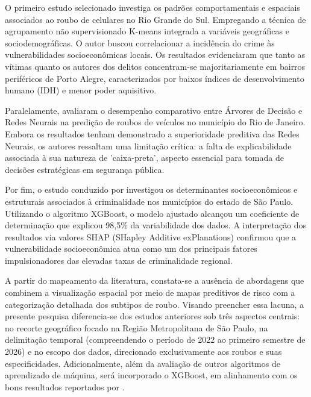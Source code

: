 \documentclass[12pt]{article}
\begin{document}
O primeiro estudo selecionado \cite{couto2024identificaccao} investiga os padrões comportamentais e espaciais associados ao roubo de celulares no Rio Grande do Sul. Empregando a técnica de agrupamento não supervisionado K-means integrada a variáveis geográficas e sociodemográficas. O autor buscou correlacionar a incidência do crime às vulnerabilidades socioeconômicas locais. Os resultados evidenciaram que tanto as vítimas quanto os autores dos delitos concentram-se majoritariamente em bairros periféricos de Porto Alegre, caracterizados por baixos índices de desenvolvimento humano (IDH) e menor poder aquisitivo.

Paralelamente, \cite{de2025previsao} avaliaram o desempenho comparativo entre Árvores de Decisão e Redes Neurais na predição de roubos de veículos no município do Rio de Janeiro. Embora os resultados tenham demonstrado a superioridade preditiva das Redes Neurais, os autores ressaltam uma limitação crítica: a falta de explicabilidade associada à sua natureza de 'caixa-preta', aspecto essencial para tomada de decisões estratégicas em segurança pública.

Por fim, o estudo conduzido por \cite{fernandes2025aplicaccao} investigou os determinantes socioeconômicos e estruturais associados à criminalidade nos municípios do estado de São Paulo. Utilizando o algoritmo XGBoost, o modelo ajustado alcançou um coeficiente de determinação que explicou 98,5\% da variabilidade dos dados. A interpretação dos resultados via valores SHAP (SHapley Additive exPlanations) confirmou que a vulnerabilidade socioeconômica atua como um dos principais fatores impulsionadores das elevadas taxas de criminalidade regional.

A partir do mapeamento da literatura, constata-se a ausência de abordagens que combinem a visualização espacial por meio de mapas preditivos de risco com a categorização detalhada dos subtipos de roubo. Visando preencher essa lacuna, a presente pesquisa diferencia-se dos estudos anteriores sob três aspectos centrais: no recorte geográfico focado na Região Metropolitana de São Paulo, na delimitação temporal (compreendendo o período de 2022 ao primeiro semestre de 2026) e no escopo dos dados, direcionado exclusivamente aos roubos e suas especificidades. Adicionalmente, além da avaliação de outros algoritmos de aprendizado de máquina, será incorporado o XGBoost, em alinhamento com os bons resultados reportados por \cite{fernandes2025aplicaccao}.

\vspace{1.2cm}
\end{document}
